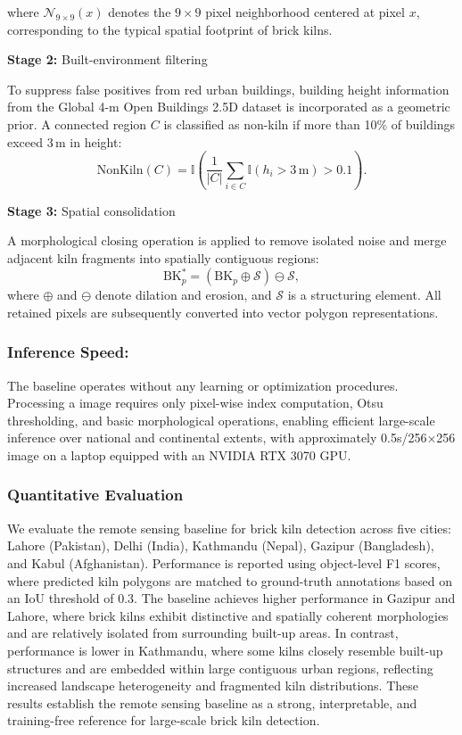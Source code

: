 \documentclass{article}
\theoremstyle{plain}
\theoremstyle{definition}
\theoremstyle{remark}
\begin{document}
where $\mathcal{N}_{9\times9}(x)$ denotes the $9 \times 9$ pixel neighborhood centered at pixel $x$, corresponding to the typical spatial footprint of brick kilns.

\textbf{Stage 2:} Built-environment filtering

To suppress false positives from red urban buildings,
building height information from the Global 4-m Open Buildings 2.5D dataset
is incorporated as a geometric prior.
A connected region $C$ is classified as non-kiln if
more than 10\% of buildings exceed 3\,m in height:
\begin{equation}
\mathrm{NonKiln}(C)
=
\mathbb{I}
\left(
\frac{1}{|C|}
\sum_{i \in C}
\mathbb{I}(h_i > 3\,\mathrm{m})
> 0.1
\right).
\end{equation}

\textbf{Stage 3:} Spatial consolidation

A morphological closing operation is applied to remove isolated noise
and merge adjacent kiln fragments into spatially contiguous regions:
\begin{equation}
\mathrm{BK}_p^{\ast}
=
(\mathrm{BK}_p \oplus \mathcal{S}) \ominus \mathcal{S},
\end{equation}
where $\oplus$ and $\ominus$ denote dilation and erosion,
and $\mathcal{S}$ is a structuring element. All retained pixels are subsequently
converted into vector polygon representations.

\subsubsection{Inference Speed:}
The baseline operates without any learning or optimization procedures.
Processing a image requires only pixel-wise
index computation, Otsu thresholding, and basic morphological operations,
enabling efficient large-scale inference over national
and continental extents, with approximately 0.5s/256×256 image on a laptop equipped with an NVIDIA RTX 3070 GPU.

\subsubsection{Quantitative Evaluation}

We evaluate the remote sensing baseline for brick kiln detection across five cities: Lahore (Pakistan), Delhi (India), Kathmandu (Nepal), Gazipur (Bangladesh), and Kabul (Afghanistan). Performance is reported using object-level F1 scores, where predicted kiln polygons are matched to ground-truth annotations based on an IoU threshold of 0.3. The baseline achieves higher performance in Gazipur and Lahore, where brick kilns exhibit distinctive and spatially coherent morphologies and are relatively isolated from surrounding built-up areas. In contrast, performance is lower in Kathmandu, where some kilns closely resemble built-up structures and are embedded within
large contiguous urban regions, reflecting increased landscape heterogeneity and fragmented kiln distributions. These results establish the remote sensing baseline as a strong, interpretable, and training-free reference for large-scale brick kiln detection.
\end{document}
